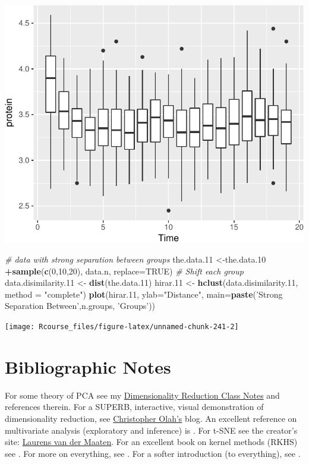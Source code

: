 \documentclass[]{book}
\newenvironment{Shaded}{\begin{snugshade}}{\end{snugshade}}
\newcommand{\KeywordTok}[1]{\textcolor[rgb]{0.13,0.29,0.53}{\textbf{#1}}}
\newcommand{\DataTypeTok}[1]{\textcolor[rgb]{0.13,0.29,0.53}{#1}}
\newcommand{\DecValTok}[1]{\textcolor[rgb]{0.00,0.00,0.81}{#1}}
\newcommand{\StringTok}[1]{\textcolor[rgb]{0.31,0.60,0.02}{#1}}
\newcommand{\CommentTok}[1]{\textcolor[rgb]{0.56,0.35,0.01}{\textit{#1}}}
\newcommand{\OtherTok}[1]{\textcolor[rgb]{0.56,0.35,0.01}{#1}}
\newcommand{\OperatorTok}[1]{\textcolor[rgb]{0.81,0.36,0.00}{\textbf{#1}}}
\newcommand{\NormalTok}[1]{#1}
\theoremstyle{definition}
\theoremstyle{definition}
\theoremstyle{definition}
\theoremstyle{remark}
\begin{document}
\includegraphics[width=0.5\linewidth]{Rcourse_files/figure-latex/unnamed-chunk-241-1}

\begin{Shaded}
\begin{Highlighting}[]
\CommentTok{# data with strong separation between groups}
\NormalTok{the.data.}\DecValTok{11}\NormalTok{ <-the.data.}\DecValTok{10} \OperatorTok{+}\KeywordTok{sample}\NormalTok{(}\KeywordTok{c}\NormalTok{(}\DecValTok{0}\NormalTok{,}\DecValTok{10}\NormalTok{,}\DecValTok{20}\NormalTok{), data.n, }\DataTypeTok{replace=}\OtherTok{TRUE}\NormalTok{) }\CommentTok{# Shift each group }
\NormalTok{data.disimilarity.}\DecValTok{11}\NormalTok{ <-}\StringTok{ }\KeywordTok{dist}\NormalTok{(the.data.}\DecValTok{11}\NormalTok{)}
\NormalTok{hirar.}\DecValTok{11}\NormalTok{ <-}\StringTok{ }\KeywordTok{hclust}\NormalTok{(data.disimilarity.}\DecValTok{11}\NormalTok{, }\DataTypeTok{method =} \StringTok{"complete"}\NormalTok{)}
\KeywordTok{plot}\NormalTok{(hirar.}\DecValTok{11}\NormalTok{, }\DataTypeTok{ylab=}\StringTok{"Distance"}\NormalTok{, }\DataTypeTok{main=}\KeywordTok{paste}\NormalTok{(}\StringTok{'Strong Separation Between'}\NormalTok{,n.groups, }\StringTok{'Groups'}\NormalTok{))}
\end{Highlighting}
\end{Shaded}

\texttt{[image: Rcourse\_files/figure-latex/unnamed-chunk-241-2]}

\section{Bibliographic Notes}\label{bibliographic-notes-8}

For some theory of PCA see my
\href{https://github.com/johnros/dim_reduce/blob/master/dim_reduce.pdf}{Dimensionality
Reduction Class Notes} and references therein. For a SUPERB,
interactive, visual demonstration of dimensionality reduction, see
\href{http://colah.github.io/posts/2014-10-Visualizing-MNIST/}{Christopher
Olah's} blog. An excellent reference on multivariate analysis
(exploratory and inference) is \citet{izenman2008modern}. For t-SNE see
the creator's site: \href{https://lvdmaaten.github.io/tsne/}{Laurens van
der Maaten}. For an excellent book on kernel methods (RKHS) see
\citet{shawe2004kernel}. For more on everything, see
\citet{friedman2001elements}. For a softer introduction (to everything),
see \citet{james2013introduction}.
\end{document}
